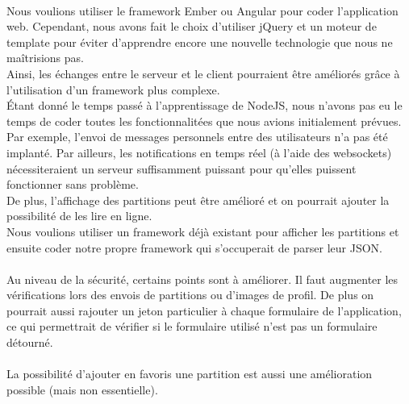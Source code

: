 \paragraph{}

\paragraph{}
Nous voulions utiliser le framework Ember ou Angular pour coder l'application web. Cependant, nous avons fait le choix d'utiliser jQuery et un moteur de template pour éviter d'apprendre encore une nouvelle technologie que nous ne maîtrisions pas. \\
Ainsi, les échanges entre le serveur et le client pourraient être améliorés grâce à l'utilisation d'un framework plus complexe. \\
Étant donné le temps passé à l'apprentissage de NodeJS, nous n'avons pas eu le temps de coder toutes les fonctionnalitées que nous avions initialement prévues. \\
Par exemple, l'envoi de messages personnels entre des utilisateurs n'a pas été implanté. Par ailleurs, les notifications en temps réel (à l'aide des websockets) nécessiteraient un serveur suffisamment puissant pour qu'elles puissent fonctionner sans problème. \\
De plus, l'affichage des partitions peut être amélioré et on pourrait ajouter la possibilité de les lire en ligne. \\
Nous voulions utiliser un framework déjà existant pour afficher les partitions et ensuite coder notre propre framework qui s'occuperait de parser leur JSON. \\
\paragraph{}
Au niveau de la sécurité, certains points sont à améliorer. Il faut augmenter les vérifications lors des envois de partitions ou d'images de profil. De plus on pourrait aussi rajouter un jeton particulier à chaque formulaire de l'application, ce qui permettrait de vérifier si le formulaire utilisé n'est pas un formulaire détourné.
\paragraph{}
La possibilité d'ajouter en favoris une partition est aussi une amélioration possible (mais non essentielle).

